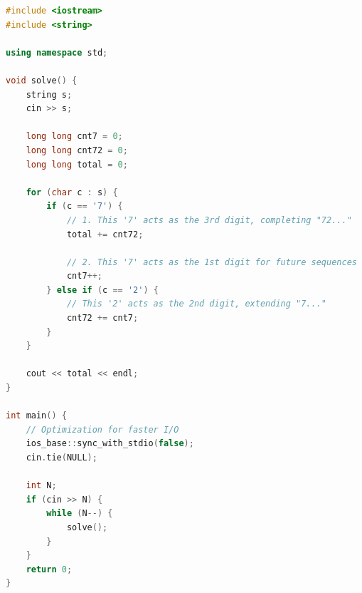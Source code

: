 \documentclass[11pt]{article}
\begin{document}
\begin{lstlisting}[language=C++]
#include <iostream>
#include <string>

using namespace std;

void solve() {
    string s;
    cin >> s;
    
    long long cnt7 = 0;
    long long cnt72 = 0;
    long long total = 0;
    
    for (char c : s) {
        if (c == '7') {
            // 1. This '7' acts as the 3rd digit, completing "72..."
            total += cnt72;
            
            // 2. This '7' acts as the 1st digit for future sequences
            cnt7++;
        } else if (c == '2') {
            // This '2' acts as the 2nd digit, extending "7..."
            cnt72 += cnt7;
        }
    }
    
    cout << total << endl;
}

int main() {
    // Optimization for faster I/O
    ios_base::sync_with_stdio(false);
    cin.tie(NULL);

    int N;
    if (cin >> N) {
        while (N--) {
            solve();
        }
    }
    return 0;
}
\end{lstlisting}
\end{document}
